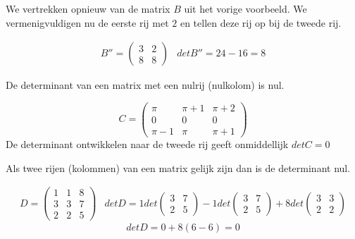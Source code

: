 	\begin{voorbeeld}
		
	We vertrekken opnieuw van de matrix $B$ uit het vorige voorbeeld. We vermenigvuldigen nu de eerste rij met $2$ en tellen deze rij op bij de tweede rij.
	
	\[ \begin{array}{ll} B''=\left( \begin{matrix}
	3 & 2 \\ 8 & 8 
	\end{matrix} \right) & det B''=24-16=8 \end{array} \]
	
	\end{voorbeeld}

\begin{eigenschap}
		De determinant van een matrix met een nulrij (nulkolom) is nul.
	\end{eigenschap}
	
	\begin{voorbeeld}
		
	
	\[ C=\left( \begin{matrix}
	\pi & \pi+1 & \pi+2 \\ 0 & 0 & 0 \\ \pi-1 & \pi & \pi+1
	\end{matrix} \right) \]
	De determinant ontwikkelen naar de tweede rij geeft onmiddellijk $det C=0$
	
	\end{voorbeeld}
\begin{voorbeeld}
		Als twee rijen (kolommen) van een matrix gelijk zijn dan is de determinant nul.
	\end{voorbeeld}
	
	\begin{voorbeeld}
		
	
	\[ \begin{array}{ll} D=\left( \begin{matrix}
	1 & 1 & 8 \\ 3 & 3 & 7 \\ 2 & 2 & 5
	\end{matrix} \right) & det D=1 det \left( \begin{matrix} 
	3 & 7 \\ 2 & 5 \end{matrix} \right) -1 det \left( \begin{matrix}
	3 & 7 \\ 2 & 5 \end{matrix} \right) + 8 det \left( \begin{matrix} 3 & 3 \\ 2 & 2 \end{matrix} \right) \end{array} \]
	\[ det D = 0 + 8 (6-6) = 0 \]
	
	
	\end{voorbeeld}	

